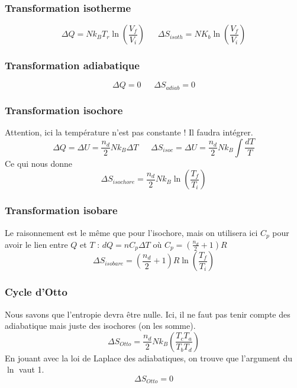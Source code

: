 \documentclass	[11pt, a4paper, openany]{book}
\begin{document}
\subsubsection{Transformation isotherme}
\begin{equation}
\Delta Q = Nk_BT_r\ln\left(\frac{V_f}{V_i}\right)\ \ \ \ \ \ \ \Delta S_{isoth} = NK_b\ln\left(\frac{V_f}{V_i}\right)
\end{equation}

\subsubsection{Transformation adiabatique}
\begin{equation}
\Delta Q =0\ \ \ \ \ \ \ \Delta S_{adiab} = 0
\end{equation}

\subsubsection{Transformation isochore}
Attention, ici la température n'est pas constante ! Il faudra intégrer.
\begin{equation}
\Delta Q = \Delta U = \frac{n_d}{2}Nk_B\Delta T\ \ \ \ \ \ \ \Delta S_{isoc} = \Delta U = \frac{n_d}{2}Nk_B\int \frac{dT}{T}
\end{equation}
Ce qui nous donne
\begin{equation}
\Delta S_{isochore} = \frac{n_d}{2}Nk_B\ln\left(\frac{T_f}{T_i}\right)
\end{equation}


\subsubsection{Transformation isobare}
Le raisonnement est le même que pour l'isochore, mais on utilisera ici $C_p$ pour avoir le lien entre $Q$ et $T$ : $dQ = nC_p \Delta T$ où $C_p = (\frac{n_d}{2}+1)R$
\begin{equation}
\Delta S_{isobare} = \left(\frac{n_d}{2}+1\right)R\ln\left(\frac{T_f}{T_i}\right)
\end{equation}

\subsubsection{Cycle d'Otto}
Nous savons que l'entropie devra être nulle. Ici, il ne faut pas tenir compte des adiabatique mais juste des isochores (on les somme).
\begin{equation}
\Delta S_{Otto} = \frac{n_d}{2}Nk_B\left(\frac{T_cT_a}{T_bT_d}\right)
\end{equation}
En jouant avec la loi de Laplace des adiabatiques, on trouve que l'argument du $\ln$ vaut 1.
\begin{equation}
\Delta S_{Otto} = 0
\end{equation}
\end{document}
